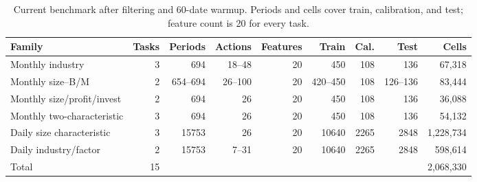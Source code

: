 \begin{table}[t]
\centering\scriptsize
\setlength{\tabcolsep}{3pt}
\caption{Current benchmark after filtering and 60-date warmup. Periods and cells cover train, calibration, and test; feature count is 20 for every task.}
\label{tab:benchmark_summary}
\begin{tabular}{lrrrrrrrr}
\toprule
Family & Tasks & Periods & Actions & Features & Train & Cal. & Test & Cells \\
\midrule
Monthly industry & 3 & 694 & 18--48 & 20 & 450 & 108 & 136 & 67,318 \\
Monthly size--B/M & 2 & 654--694 & 26--100 & 20 & 420--450 & 108 & 126--136 & 83,444 \\
Monthly size/profit/invest & 2 & 694 & 26 & 20 & 450 & 108 & 136 & 36,088 \\
Monthly two-characteristic & 3 & 694 & 26 & 20 & 450 & 108 & 136 & 54,132 \\
Daily size characteristic & 3 & 15753 & 26 & 20 & 10640 & 2265 & 2848 & 1,228,734 \\
Daily industry/factor & 2 & 15753 & 7--31 & 20 & 10640 & 2265 & 2848 & 598,614 \\
Total & 15 &  &  &  &  &  &  & 2,068,330 \\
\bottomrule
\end{tabular}
\end{table}
